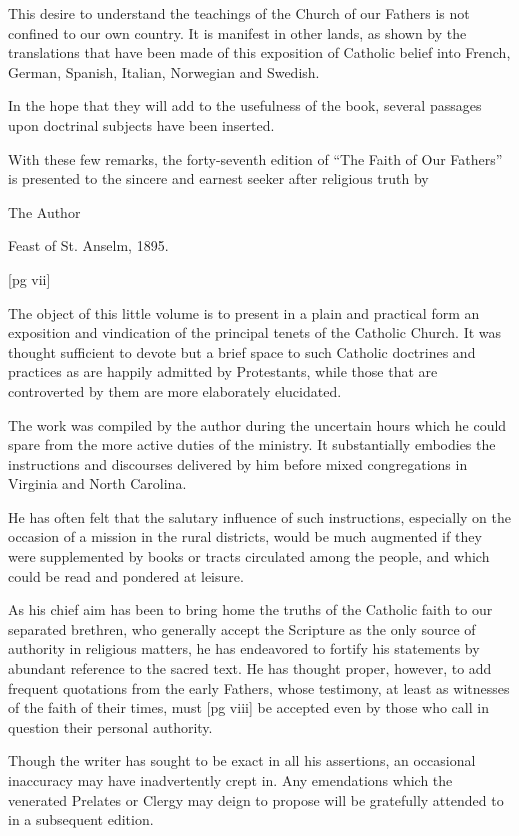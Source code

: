 This desire to understand the teachings of the
Church of our Fathers is not confined to our own
country. It is manifest in other lands, as shown
by the translations that have been made of this
exposition of Catholic belief into French, German,
Spanish, Italian, Norwegian and Swedish.

In the hope that they will add to the usefulness
of the book, several passages upon doctrinal subjects
have been inserted.

With these few remarks, the forty-seventh edition
of “The Faith of Our Fathers” is presented
to the sincere and earnest seeker after religious
truth by

The Author

Feast of St. Anselm, 1895.

[pg vii]


The object of this little volume is to present in a
plain and practical form an exposition and vindication
of the principal tenets of the Catholic
Church. It was thought sufficient to devote but a
brief space to such Catholic doctrines and practices
as are happily admitted by Protestants, while
those that are controverted by them are more elaborately
elucidated.

The work was compiled by the author during the
uncertain hours which he could spare from the
more active duties of the ministry. It substantially
embodies the instructions and discourses delivered
by him before mixed congregations in Virginia
and North Carolina.

He has often felt that the salutary influence of
such instructions, especially on the occasion of a
mission in the rural districts, would be much augmented
if they were supplemented by books or
tracts circulated among the people, and which
could be read and pondered at leisure.

As his chief aim has been to bring home the
truths of the Catholic faith to our separated
brethren, who generally accept the Scripture as
the only source of authority in religious matters,
he has endeavored to fortify his statements by
abundant reference to the sacred text. He has
thought proper, however, to add frequent quotations
from the early Fathers, whose testimony, at
least as witnesses of the faith of their times, must
[pg viii]
be accepted even by those who call in question
their personal authority.

Though the writer has sought to be exact in all
his assertions, an occasional inaccuracy may have
inadvertently crept in. Any emendations which
the venerated Prelates or Clergy may deign to
propose will be gratefully attended to in a subsequent
edition.

